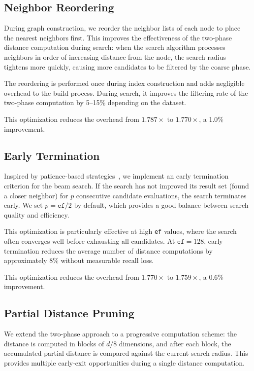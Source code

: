 \documentclass[10pt,journal,compsoc]{IEEEtran}
\begin{document}
\subsection{Neighbor Reordering}

During graph construction, we reorder the neighbor lists of each node to place the nearest neighbors first. This improves the effectiveness of the two-phase distance computation during search: when the search algorithm processes neighbors in order of increasing distance from the node, the search radius tightens more quickly, causing more candidates to be filtered by the coarse phase.

The reordering is performed once during index construction and adds negligible overhead to the build process. During search, it improves the filtering rate of the two-phase computation by 5--15\% depending on the dataset.

This optimization reduces the overhead from $1.787\times$ to $1.770\times$, a 1.0\% improvement.

\subsection{Early Termination}

Inspired by patience-based strategies~\cite{teofili2025patience}, we implement an early termination criterion for the beam search. If the search has not improved its result set (found a closer neighbor) for $p$ consecutive candidate evaluations, the search terminates early. We set $p = \texttt{ef} / 2$ by default, which provides a good balance between search quality and efficiency.

This optimization is particularly effective at high \texttt{ef} values, where the search often converges well before exhausting all candidates. At $\texttt{ef} = 128$, early termination reduces the average number of distance computations by approximately 8\% without measurable recall loss.

This optimization reduces the overhead from $1.770\times$ to $1.759\times$, a 0.6\% improvement.

\subsection{Partial Distance Pruning}

We extend the two-phase approach to a progressive computation scheme: the distance is computed in blocks of $d/8$ dimensions, and after each block, the accumulated partial distance is compared against the current search radius. This provides multiple early-exit opportunities during a single distance computation.
\end{document}
